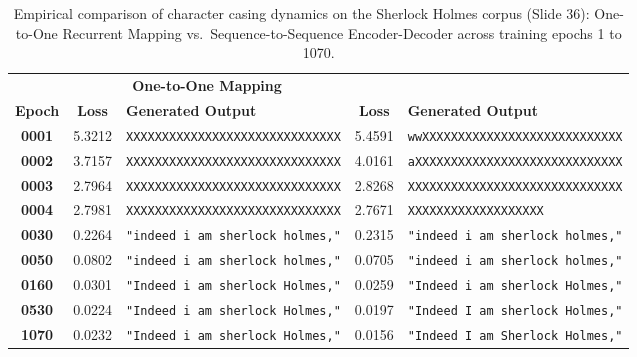 \documentclass[../../main.tex]{subfiles}
\begin{document}
\begin{table}[htbp]
\centering
\footnotesize
\caption{Empirical comparison of character casing dynamics on the Sherlock Holmes corpus (Slide 36): One-to-One Recurrent Mapping vs.~Sequence-to-Sequence Encoder-Decoder across training epochs 1 to 1070.}
\label{tab:sherlock_seq2seq_comparison}
\begin{tabularx}{\textwidth}{@{} c c >{\raggedright\arraybackslash}X c >{\raggedright\arraybackslash}X @{}}
\toprule
& \multicolumn{2}{c}{\textbf{One-to-One Mapping}} & \multicolumn{2}{c}{\textbf{Encoder-Decoder Architecture}} \\
\cmidrule(lr){2-3} \cmidrule(lr){4-5}
\textbf{Epoch} & \textbf{Loss} & \textbf{Generated Output} & \textbf{Loss} & \textbf{Generated Output} \\
\midrule
\textbf{0001} & 5.3212 & \texttt{XXXXXXXXXXXXXXXXXXXXXXXXXXXXXX} & 5.4591 & \texttt{wwXXXXXXXXXXXXXXXXXXXXXXXXXXXX} \\
\textbf{0002} & 3.7157 & \texttt{XXXXXXXXXXXXXXXXXXXXXXXXXXXXXX} & 4.0161 & \texttt{aXXXXXXXXXXXXXXXXXXXXXXXXXXXXX} \\
\textbf{0003} & 2.7964 & \texttt{XXXXXXXXXXXXXXXXXXXXXXXXXXXXXX} & 2.8268 & \texttt{XXXXXXXXXXXXXXXXXXXXXXXXXXXXXX} \\
\textbf{0004} & 2.7981 & \texttt{XXXXXXXXXXXXXXXXXXXXXXXXXXXXXX} & 2.7671 & \texttt{XXXXXXXXXXXXXXXXXXX} \\
\midrule
\textbf{0030} & 0.2264 & \texttt{"indeed i am sherlock holmes,"} & 0.2315 & \texttt{"indeed i am sherlock holmes,"} \\
\textbf{0050} & 0.0802 & \texttt{"indeed i am sherlock holmes,"} & 0.0705 & \texttt{"indeed i am sherlock holmes,"} \\
\midrule
\textbf{0160} & 0.0301 & \texttt{"Indeed i am sherlock Holmes,"} & 0.0259 & \texttt{"Indeed i am sherlock Holmes,"} \\
\textbf{0530} & 0.0224 & \texttt{"Indeed i am sherlock Holmes,"} & 0.0197 & \texttt{"Indeed I am sherlock Holmes,"} \\
\textbf{1070} & 0.0232 & \texttt{"Indeed i am sherlock Holmes,"} & 0.0156 & \texttt{"Indeed I am Sherlock Holmes,"} \\
\bottomrule
\end{tabularx}
\end{table}
\end{document}
